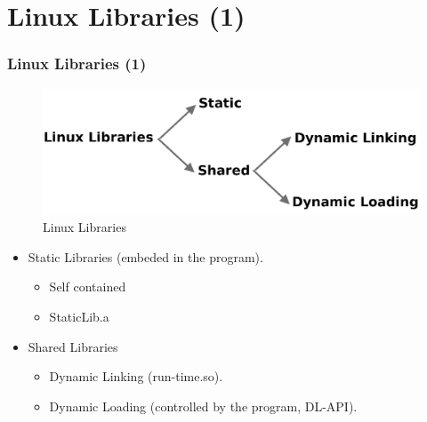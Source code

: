 \documentclass[xcolor=table, notheorems, hyperref={pdfpagelabels=false}]{beamer}
\begin{document}
\section{Linux Libraries (1)}
\begin{frame}
\frametitle{Linux Libraries (1)}

\begin{figure}
\includegraphics[width=0.8\linewidth]{os04-linux-lib}
\caption{Linux Libraries}
\end{figure}

\begin{itemize}
\item Static Libraries (embeded in the program).
\begin{itemize}
\item Self contained
\item StaticLib.a
\end{itemize}
\item Shared Libraries
\begin{itemize}
\item Dynamic Linking (run-time.so).
\item Dynamic Loading (controlled by the program, DL-API).
\end{itemize}
\end{itemize}

\end{frame}

\end{document}
